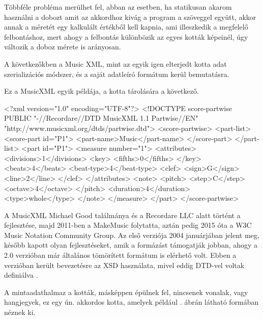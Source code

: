 Többféle probléma merülhet fel, abban az esetben, ha statikusan akarom használni a dobozt amit az akkordhoz kivág a program a szöveggel együtt, akkor annak a méretét egy kalkulált értékből kell kapnia, ami illeszkedik a megfelelő felbontáshoz, mert ahogy a felbontás különbözik az egyes kották képeinél, úgy változik a doboz mérete is arányosan.


A következőkben a Music XML, mint az egyik igen elterjedt kotta adat szerializációs módszer, és a saját adatleíró formátum kerül bemutatásra.


Ez a MusicXML egyik példája, a kotta tárolására a következő.
\begin{xml}
<?xml version="1.0" encoding="UTF-8"?>
<!DOCTYPE score-partwise PUBLIC "-//Recordare//DTD MusicXML 1.1 Partwise//EN" "http://www.musicxml.org/dtds/partwise.dtd">
<score-partwise>
   <part-list>
      <score-part id="P1">
         <part-name>Music</part-name>
      </score-part>
   </part-list>
   <part id="P1">
      <measure number="1">
         <attributes>
            <divisions>1</divisions>
            <key>
               <fifths>0</fifths>
            </key>
            <beats>4</beats>
            <beat-type>4</beat-type>
            <clef>
               <sign>G</sign>
               <line>2</line>
            </clef>
         </attributes>
         <note>
            <pitch>
               <step>C</step>
               <octave>4</octave>
            </pitch>
            <duration>4</duration>
            <type>whole</type>
         </note>
      </measure>
   </part>
</score-partwise>
\end{xml}
A MusicXML Michael Good találmánya és a Recordare LLC alatt történt a fejlesztése, majd 2011-ben a MakeMusic folytatta, aztán pedig 2015 óta a W3C Music Notation Community Group. Az első verziója 2004 januárjában jelent meg, később kapott olyan fejlesztéseket, amik a formázást támogatják jobban, ahogy a 2.0 verzióban már általános tömörített formátum is elérhető volt. Ebben a verzióban került bevezetésre az XSD használata, mivel eddig DTD-vel voltak definiálva \cite{enwiki:1065665260}.


A mintaadathalmaz a kották, másképpen épülnek fel, nincsenek vonalak, vagy hangjegyek, ez egy ún. akkordos kotta, amelyek például . ábrán látható formában néznek ki.

